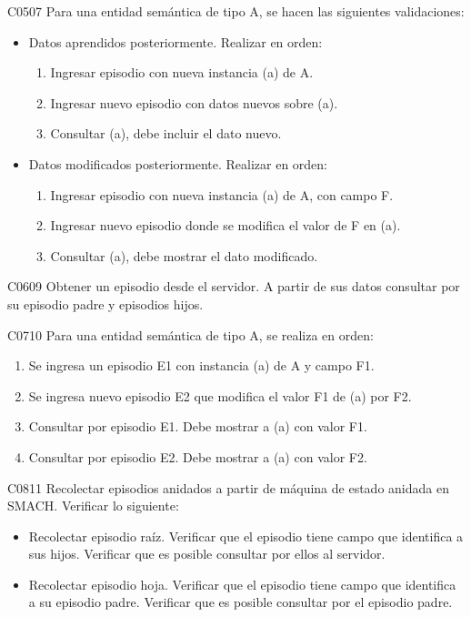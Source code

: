 \begin{def-validacion}{C}{05}{07}
	Para una entidad semántica de tipo A, se hacen las siguientes validaciones:
	\begin{itemize}
		\item Datos aprendidos posteriormente. Realizar en orden:
		\begin{enumerate}
			\item Ingresar episodio con nueva instancia (a) de A.
			\item Ingresar nuevo episodio con datos nuevos sobre (a).
			\item Consultar (a), debe incluir el dato nuevo.
		\end{enumerate}
		\item Datos modificados posteriormente. Realizar en orden:
		\begin{enumerate}
			\item Ingresar episodio con nueva instancia (a) de A, con campo F.
			\item Ingresar nuevo episodio donde se modifica el valor de F en (a).
			\item Consultar (a), debe mostrar el dato modificado.
		\end{enumerate}
	\end{itemize}
\end{def-validacion}

\begin{def-validacion}{C}{06}{09}
	Obtener un episodio desde el servidor. A partir de sus datos consultar por su episodio padre y episodios hijos.	
\end{def-validacion}

\begin{def-validacion}{C}{07}{10}
	Para una entidad semántica de tipo A, se realiza en orden:
	\begin{enumerate}
		\item Se ingresa un episodio E1 con instancia (a) de A y campo F1.
		\item Se ingresa nuevo episodio E2 que modifica el valor F1 de (a) por F2.
		\item Consultar por episodio E1. Debe mostrar a (a) con valor F1.
		\item Consultar por episodio E2. Debe mostrar a (a) con valor F2.
	\end{enumerate}
\end{def-validacion}

\begin{def-validacion}{C}{08}{11}
	Recolectar episodios anidados a partir de máquina de estado anidada en SMACH. Verificar lo siguiente:
	\begin{itemize}
		\item Recolectar episodio raíz. Verificar que el episodio tiene campo que identifica a sus hijos. Verificar que es posible consultar por ellos al servidor.
		\item Recolectar episodio hoja. Verificar que el episodio tiene campo que identifica a su episodio padre. Verificar que es posible consultar por el episodio padre.
	\end{itemize}
\end{def-validacion}

